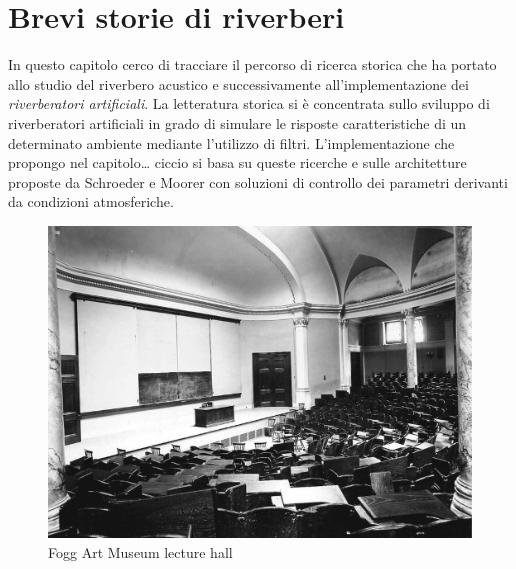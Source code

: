 
\chapter{Brevi storie di riverberi}
\label{chp:Brevi storie di riverberi}

In questo capitolo cerco di tracciare il percorso di ricerca storica che ha
portato allo studio del riverbero acustico e successivamente all’implementazione
dei \textit{riverberatori artificiali}.  La
letteratura storica si è concentrata sullo sviluppo di riverberatori artificiali
in grado di simulare le risposte caratteristiche di un determinato ambiente
mediante l’utilizzo di filtri. L'implementazione che propongo nel capitolo\ldots
ciccio  si basa su queste ricerche e
sulle architetture proposte da Schroeder e Moorer 
con soluzioni di controllo dei parametri derivanti da condizioni atmosferiche.

\vfill\null

\begin{figure}[hb]
\centering
\includegraphics[width=\textwidth]{Graphics/Sabine-Fogg.png}
\caption{Fogg Art Museum lecture hall}
\label{fig:fogg}
\end{figure}

\clearpage






